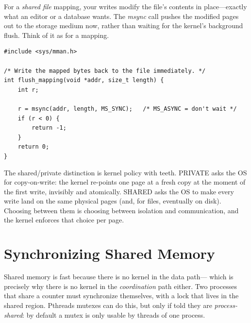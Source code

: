 For a \emph{shared file} mapping, your writes modify the file's
contents in place---exactly what an editor or a database wants. The
\emph{msync} call pushes the modified pages out to the storage medium
now, rather than waiting for the kernel's background flush. Think of
it as  for a mapping.

\begin{lstlisting}[caption={msync: flush a shared mapping to disk.}]
#include <sys/mman.h>

/* Write the mapped bytes back to the file immediately. */
int flush_mapping(void *addr, size_t length) {
    int r;

    r = msync(addr, length, MS_SYNC);   /* MS_ASYNC = don't wait */
    if (r < 0) {
        return -1;
    }
    return 0;
}
\end{lstlisting}

\begin{osconcept}
The shared/private distinction is kernel policy with teeth. PRIVATE
asks the OS for copy-on-write: the kernel re-points one page at a
fresh copy at the moment of the first write, invisibly and
atomically. SHARED asks the OS to make every write land on the same
physical pages (and, for files, eventually on disk). Choosing between
them is choosing between isolation and communication, and the kernel
enforces that choice per page.
\end{osconcept}

\section{Synchronizing Shared Memory}

Shared memory is fast because there is no kernel in the data path---
which is precisely why there is no kernel in the \emph{coordination}
path either. Two processes that share a counter must synchronize
themselves, with a lock that lives in the shared region. Pthreads
mutexes can do this, but only if told they are \emph{process-shared}:
by default a mutex is only usable by threads of one process.

